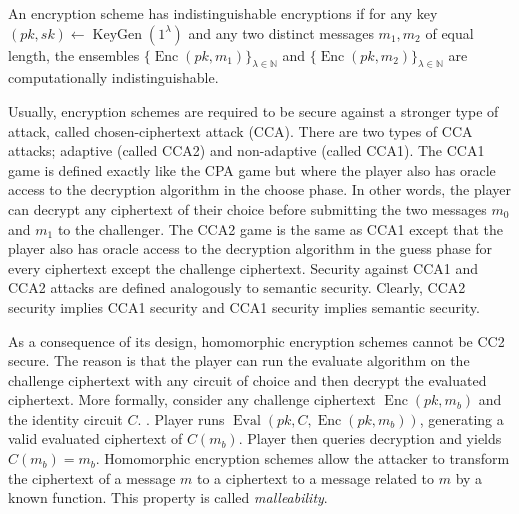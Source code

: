 \begin{definition}
    An encryption scheme has indistinguishable encryptions if for any key $(pk,sk) \leftarrow \operatorname{KeyGen}(1^{\lambda})$ and any two distinct messages $m_1, m_2$ of equal length, the ensembles $\{\operatorname{Enc}(pk,m_1)\}_{\lambda \in \mathbb{N}}$ and $\{\operatorname{Enc}(pk,m_2)\}_{\lambda \in \mathbb{N}}$ are computationally indistinguishable.
\end{definition}

Usually, encryption schemes are required to be secure against a stronger type of attack, called chosen-ciphertext attack (CCA). There are two types of CCA attacks; adaptive (called CCA2) and non-adaptive (called CCA1). The CCA1 game is defined exactly like the CPA game but where the player also has oracle access to the decryption algorithm in the choose phase. In other words, the player can decrypt any ciphertext of their choice before submitting the two messages $m_0$ and $m_1$ to the challenger. The CCA2 game is the same as CCA1 except that the player also has oracle access to the decryption algorithm in the guess phase for every ciphertext except the challenge ciphertext. Security against CCA1 and CCA2 attacks are defined analogously to semantic security. Clearly, CCA2 security implies CCA1 security and CCA1 security implies semantic security.

As a consequence of its design, homomorphic encryption schemes cannot be CC2 secure. The reason is that the player can run the evaluate algorithm on the challenge ciphertext with any circuit of choice and then decrypt the evaluated ciphertext. More formally, consider any challenge ciphertext $\operatorname{Enc}(pk,m_b)$ and the identity circuit $C$. . Player runs $\operatorname{Eval}(pk,C,\operatorname{Enc}(pk,m_b))$, generating a valid evaluated ciphertext of $C(m_b)$. Player then queries decryption and yields $C(m_b) = m_b$. Homomorphic encryption schemes allow the attacker to transform the ciphertext of a message $m$ to a ciphertext to a message related to $m$ by a known function. This property is called \textit{malleability}.

\begin{definition}
    
\end{definition}


